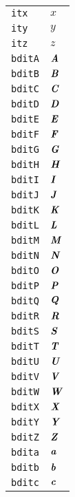 \begin{longtable}{ll}
\texttt{itx}&${}\textit{x}{}$\\
\texttt{ity}&${}\textit{y}{}$\\
\texttt{itz}&${}\textit{z}{}$\\
\texttt{bditA}&${}\textbf{\textit{A}}{}$\\
\texttt{bditB}&${}\textbf{\textit{B}}{}$\\
\texttt{bditC}&${}\textbf{\textit{C}}{}$\\
\texttt{bditD}&${}\textbf{\textit{D}}{}$\\
\texttt{bditE}&${}\textbf{\textit{E}}{}$\\
\texttt{bditF}&${}\textbf{\textit{F}}{}$\\
\texttt{bditG}&${}\textbf{\textit{G}}{}$\\
\texttt{bditH}&${}\textbf{\textit{H}}{}$\\
\texttt{bditI}&${}\textbf{\textit{I}}{}$\\
\texttt{bditJ}&${}\textbf{\textit{J}}{}$\\
\texttt{bditK}&${}\textbf{\textit{K}}{}$\\
\texttt{bditL}&${}\textbf{\textit{L}}{}$\\
\texttt{bditM}&${}\textbf{\textit{M}}{}$\\
\texttt{bditN}&${}\textbf{\textit{N}}{}$\\
\texttt{bditO}&${}\textbf{\textit{O}}{}$\\
\texttt{bditP}&${}\textbf{\textit{P}}{}$\\
\texttt{bditQ}&${}\textbf{\textit{Q}}{}$\\
\texttt{bditR}&${}\textbf{\textit{R}}{}$\\
\texttt{bditS}&${}\textbf{\textit{S}}{}$\\
\texttt{bditT}&${}\textbf{\textit{T}}{}$\\
\texttt{bditU}&${}\textbf{\textit{U}}{}$\\
\texttt{bditV}&${}\textbf{\textit{V}}{}$\\
\texttt{bditW}&${}\textbf{\textit{W}}{}$\\
\texttt{bditX}&${}\textbf{\textit{X}}{}$\\
\texttt{bditY}&${}\textbf{\textit{Y}}{}$\\
\texttt{bditZ}&${}\textbf{\textit{Z}}{}$\\
\texttt{bdita}&${}\textbf{\textit{a}}{}$\\
\texttt{bditb}&${}\textbf{\textit{b}}{}$\\
\texttt{bditc}&${}\textbf{\textit{c}}{}$\\

\end{longtable}
